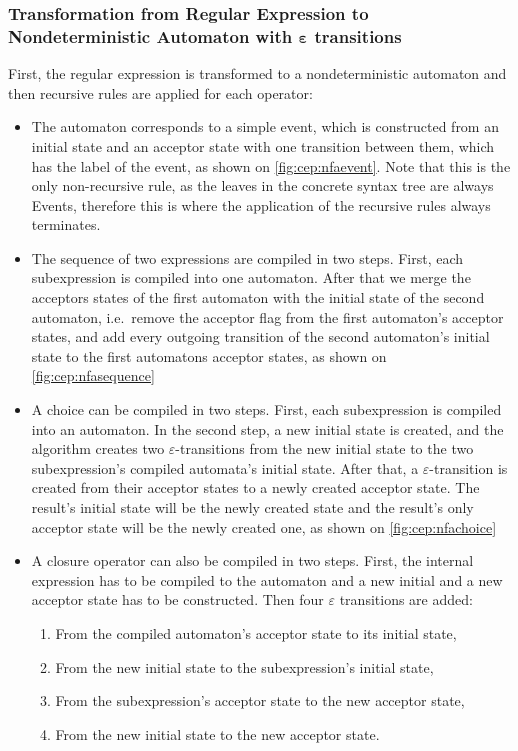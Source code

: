 			\subsubsection{Transformation from Regular Expression to Nondeterministic Automaton with $\bm{\varepsilon}$ transitions}
			\label{section:re2nfa}
			First, the regular expression is transformed to a nondeterministic automaton and then recursive rules are applied for each operator:
			\begin{itemize}
				\item The automaton corresponds to a simple event, which is constructed from an initial state and an acceptor state with one transition between them, which has the label of the event, as shown on \cref{fig:cep:nfaevent}. Note that this is the only non-recursive rule, as the leaves in the concrete syntax tree are always Events, therefore this is where the application of the recursive rules always terminates.
				\item The sequence of two expressions are compiled in two steps. First, each subexpression is compiled into one automaton. After that we merge the acceptors states of the first automaton with the initial state of the second automaton, i.e.~remove the acceptor flag from the first automaton's acceptor states, and add every outgoing transition of the second automaton's initial state to the first automatons acceptor states, as shown on \cref{fig:cep:nfasequence}
				\item A choice can be compiled in two steps. First, each subexpression is compiled into an automaton. In the second step, a new initial state is created, and the algorithm creates two $\varepsilon$-transitions from the new initial state to the two subexpression's compiled automata's initial state. After that, a $\varepsilon$-transition is created from their acceptor states to a newly created acceptor state. The result's initial state will be the newly created state and the result's only acceptor state will be the newly created one, as shown on \cref{fig:cep:nfachoice}
				\item A closure operator can also be compiled in two steps. First, the internal expression has to be compiled to the automaton and a new initial and a new acceptor state has to be constructed. Then four $\varepsilon$ transitions are added:
				\begin{enumerate}
					\item From the compiled automaton's acceptor state to its initial state,
					\item From the new initial state to the subexpression's initial state,
					\item From the subexpression's acceptor state to the new acceptor state,
					\item From the new initial state to the new acceptor state.
				\end{enumerate}
			\end{itemize}
		
